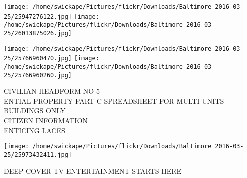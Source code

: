 \documentclass[10pt,letterpaper]{article}
\begin{document}
\texttt{[image: /home/swickape/Pictures/flickr/Downloads/Baltimore 2016-03-25/25947276122.jpg]}
\texttt{[image: /home/swickape/Pictures/flickr/Downloads/Baltimore 2016-03-25/26013875026.jpg]}

\texttt{[image: /home/swickape/Pictures/flickr/Downloads/Baltimore 2016-03-25/25766960470.jpg]}
\texttt{[image: /home/swickape/Pictures/flickr/Downloads/Baltimore 2016-03-25/25766960260.jpg]}

CIVILIAN HEADFORM NO 5\\
ENTIAL PROPERTY PART C SPREADSHEET FOR MULTI{-}UNITS BUILDINGS ONLY\\
CITIZEN INFORMATION\\
ENTICING LACES\\
\pagebreak

\texttt{[image: /home/swickape/Pictures/flickr/Downloads/Baltimore 2016-03-25/25973432411.jpg]}

DEEP COVER TV ENTERTAINMENT STARTS HERE\\
\pagebreak
\end{document}
